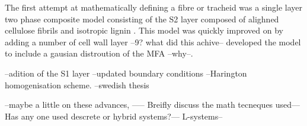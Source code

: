  The first attempt at mathematically defining a fibre or tracheid was a single layer two phase composite model consisting of the S2 layer composed of alighned cellulose fibrils and isotropic lignin \cite{Barber_1964}. This model was quickly improved on by \cite{mark1967cell} adding a number of cell wall layer --9? what did this achive-- \cite{Cave_1968} developed the model to include a gausian distroution of the MFA --why--. 
 
 --adition of the S1 layer
 --updated boundary conditions
 --Harington homogenisation scheme. 
 --swedish thesis
 
 --maybe a little on these advances, ----- Breifly discuss the math
tecneques used---Has any one used descrete or hybrid systems?--- L-systems--